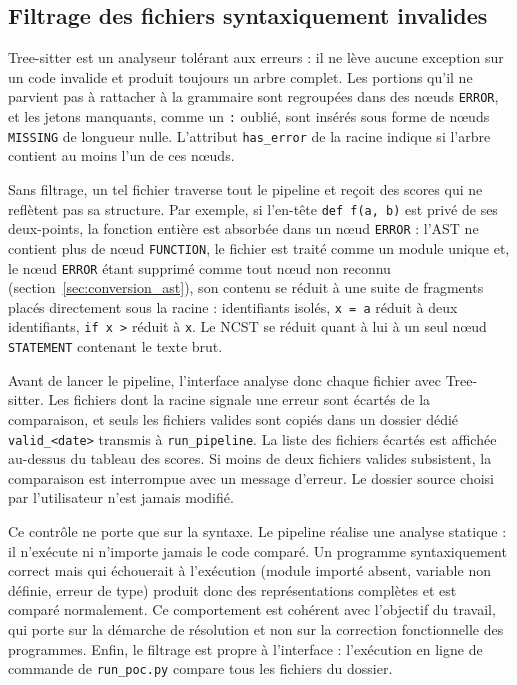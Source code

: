 \documentclass[12pt,a4paper,oneside]{report}
\begin{document}
\subsection{Filtrage des fichiers syntaxiquement invalides}
\label{sec:filtrage}

Tree-sitter est un analyseur tolérant aux erreurs : il ne lève aucune
exception sur un code invalide et produit toujours un arbre complet. Les
portions qu'il ne parvient pas à rattacher à la grammaire sont regroupées
dans des nœuds \texttt{ERROR}, et les jetons manquants, comme un
\og \texttt{:} \fg{} oublié, sont insérés sous forme de nœuds
\texttt{MISSING} de longueur nulle. L'attribut \texttt{has\_error} de la
racine indique si l'arbre contient au moins l'un de ces nœuds.

Sans filtrage, un tel fichier traverse tout le pipeline et reçoit des scores
qui ne reflètent pas sa structure. Par exemple, si l'en-tête
\texttt{def f(a, b)} est privé de ses deux-points, la fonction entière est
absorbée dans un nœud \texttt{ERROR} : l'AST ne contient plus de nœud
\texttt{FUNCTION}, le fichier est traité comme un module unique et, le
nœud \texttt{ERROR} étant supprimé comme tout nœud non reconnu
(section~\ref{sec:conversion_ast}), son contenu se réduit à une suite de
fragments placés directement sous la racine : identifiants isolés,
\texttt{x = a} réduit à deux identifiants, \texttt{if x >} réduit à
\texttt{x}. Le NCST se réduit quant à lui à un seul nœud \texttt{STATEMENT}
contenant le texte brut.

Avant de lancer le pipeline, l'interface analyse donc chaque fichier avec
Tree-sitter. Les fichiers dont la racine signale une erreur sont écartés de
la comparaison, et seuls les fichiers valides sont copiés dans un dossier
dédié \texttt{valid\_<date>} transmis à \texttt{run\_pipeline}. La liste des
fichiers écartés est affichée au-dessus du tableau des scores. Si moins de
deux fichiers valides subsistent, la comparaison est interrompue avec un
message d'erreur. Le dossier source choisi par l'utilisateur n'est jamais
modifié.

Ce contrôle ne porte que sur la syntaxe. Le pipeline réalise une analyse
statique : il n'exécute ni n'importe jamais le code comparé. Un programme
syntaxiquement correct mais qui échouerait à l'exécution (module importé
absent, variable non définie, erreur de type) produit donc des
représentations complètes et est comparé normalement. Ce comportement est
cohérent avec l'objectif du travail, qui porte sur la démarche de résolution
et non sur la correction fonctionnelle des programmes. Enfin, le filtrage est
propre à l'interface : l'exécution en ligne de commande de
\texttt{run\_poc.py} compare tous les fichiers du dossier.
\end{document}
